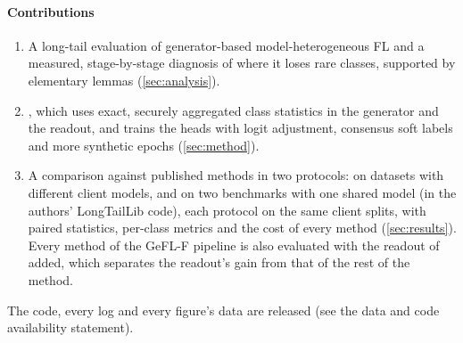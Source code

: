 \paragraph{Contributions}
\begin{enumerate}
\item A long-tail evaluation of generator-based model-heterogeneous FL and a measured, stage-by-stage diagnosis of
where it loses rare classes, supported by elementary lemmas (\cref{sec:analysis}).
\item \ours, which uses exact, securely aggregated class statistics in the generator and the readout, and trains the
heads with logit adjustment, consensus soft labels and more synthetic epochs
(\cref{sec:method}).
\item A comparison against  published methods in two protocols:  on
 datasets with different client models, and  on two benchmarks with one shared
model (in the authors' LongTailLib code), each protocol on the same client splits, with paired statistics, per-class
metrics and the cost of every method (\cref{sec:results}). Every method of the GeFL-F pipeline is also evaluated with
the readout of \ours added, which separates the readout's gain from that of the rest of the method. 
\end{enumerate}
The code, every log and every figure's data are released (see the data and code availability statement).
